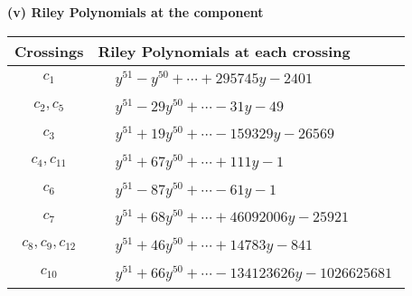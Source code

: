 \documentclass[1p]{elsarticle_modified}
\theoremstyle{definition}
\begin{document}
\newpage\renewcommand{\arraystretch}{1}
\flushleft \textbf{(v) Riley Polynomials at the component}\newline \\
\begin{tabular}{m{50pt}|m{274pt}}
Crossings & \hspace{64pt}Riley Polynomials at each crossing \\
\hline $$\begin{aligned}c_{1}\end{aligned}$$&$\begin{aligned}
&y^{51}- y^{50}+\cdots+295745 y-2401
\end{aligned}$\\
\hline $$\begin{aligned}c_{2},c_{5}\end{aligned}$$&$\begin{aligned}
&y^{51}-29 y^{50}+\cdots-31 y-49
\end{aligned}$\\
\hline $$\begin{aligned}c_{3}\end{aligned}$$&$\begin{aligned}
&y^{51}+19 y^{50}+\cdots-159329 y-26569
\end{aligned}$\\
\hline $$\begin{aligned}c_{4},c_{11}\end{aligned}$$&$\begin{aligned}
&y^{51}+67 y^{50}+\cdots+111 y-1
\end{aligned}$\\
\hline $$\begin{aligned}c_{6}\end{aligned}$$&$\begin{aligned}
&y^{51}-87 y^{50}+\cdots-61 y-1
\end{aligned}$\\
\hline $$\begin{aligned}c_{7}\end{aligned}$$&$\begin{aligned}
&y^{51}+68 y^{50}+\cdots+46092006 y-25921
\end{aligned}$\\
\hline $$\begin{aligned}c_{8},c_{9},c_{12}\end{aligned}$$&$\begin{aligned}
&y^{51}+46 y^{50}+\cdots+14783 y-841
\end{aligned}$\\
\hline $$\begin{aligned}c_{10}\end{aligned}$$&$\begin{aligned}
&y^{51}+66 y^{50}+\cdots-134123626 y-1026625681
\end{aligned}$\\
\hline
\end{tabular}\\~\\
\end{document}
